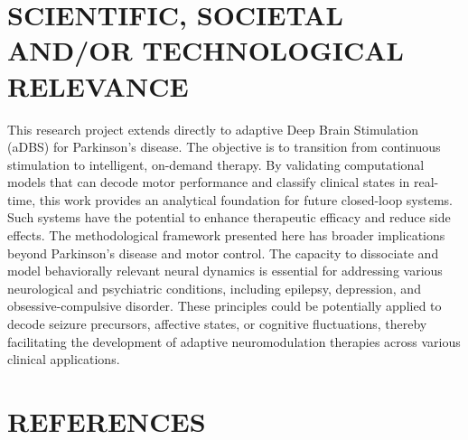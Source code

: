 \documentclass[12pt, a4paper]{article}
\begin{document}
\newpage

\section{SCIENTIFIC, SOCIETAL AND/OR TECHNOLOGICAL RELEVANCE}

This research project extends directly to adaptive Deep Brain Stimulation (aDBS) for Parkinson's disease. The objective is to transition from continuous stimulation to intelligent, on-demand therapy. By validating computational models that can decode motor performance and classify clinical states in real-time, this work provides an analytical foundation for future closed-loop systems. Such systems have the potential to enhance therapeutic efficacy and reduce side effects. The methodological framework presented here has broader implications beyond Parkinson's disease and motor control. The capacity to dissociate and model behaviorally relevant neural dynamics is essential for addressing various neurological and psychiatric conditions, including epilepsy, depression, and obsessive-compulsive disorder. These principles could be potentially applied to decode seizure precursors, affective states, or cognitive fluctuations, thereby facilitating the development of adaptive neuromodulation therapies across various clinical applications.
\section{REFERENCES}
\printbibliography[heading=none]
\end{document}
